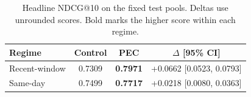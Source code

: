 \begin{table}[!h]
\renewcommand{\arraystretch}{1.10}
\caption{Headline NDCG@10 on the fixed test pools. Deltas use unrounded scores. Bold marks the higher score within each regime.}
\label{tab:headline}
\centering
\small
\setlength{\tabcolsep}{4pt}
\begin{tabular*}{\linewidth}{@{\extracolsep{\fill}}lccc@{}}
\toprule
Regime & Control & PEC & $\Delta$ [95\% CI] \\
\midrule
Recent-window & 0.7309 & \textbf{0.7971} & +0.0662 [0.0523, 0.0793] \\
Same-day & 0.7499 & \textbf{0.7717} & +0.0218 [0.0080, 0.0363] \\
\bottomrule
\end{tabular*}
\end{table}
